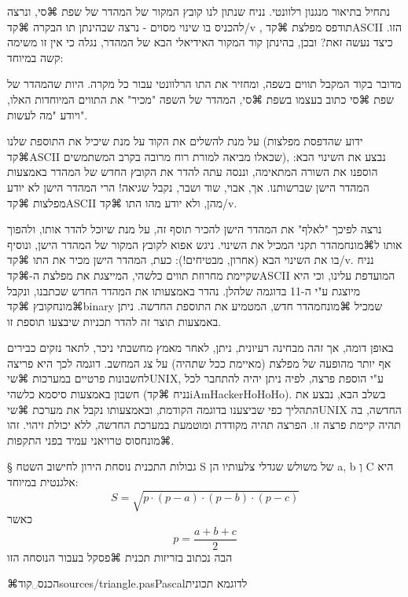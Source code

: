 {נתחיל בתיאור מנגנון רלוונטי. נניח שנתון לנו קובץ המקור של המהדר של שפת ⌘סי, ונרצה להכניס בו שינוי מסוים - נרצה שבהינתן תו הבקרה ⌘קד{/v} , תודפס מפלצת ⌘קד{ASCII} הזו. כיצד נעשה זאת? ובכן, בהינתן קוד המקור האידיאלי הבא של המהדר, נגלה כי אין זו משימה קשה במיוחד:

מדובר בקוד המקבל תווים בשפה, ומחזיר את התו הרלוונטי עבור כל מקרה. היות שהמהדר של שפת ⌘סי כתוב בעצמו בשפת ⌘סי, המהדר של השפה "מכיר" את התווים המיוחדות האלו, ויודע "מה לעשות". 

על מנת להשלים את הקוד על מנת שיכיל את התוספת שלנו (ידוע שהדפסת מפלצות ⌘קד{ASCII} שכאלו מביאה למורת רוח מרובה בקרב המשתמשים), נבצע את השינוי הבא: 
הוספנו את השורה המתאימה, וננסה עתה להדר את הקובץ החדש של המהדר באמצעות המהדר הישן שברשותנו. אך, אבוי, שוד ושבר, נקבל שגיאה! הרי המהדר הישן לא יודע מפלצות ⌘קד{ASCII} מהן, ולא יודע מהו התו ⌘קד{/v}. 

נרצה לפיכך "לאלף" את המהדר הישן להכיר תוסף זה, על מנת שיוכל להדר אותו, ולהפוך אותו ל⌘מונח{מהדר} תקני המכיל את השינוי. ניגש אפוא לקובץ המקור של המהדר הישן, ונוסיף בו את השינוי הבא (אחרון, מבטיחים!):
כעת, המהדר הישן מכיר את התו ⌘קד{/v}. נניח שקיימת מחרוזת תווים כלשהי, המייצגת את מפלצת ה-⌘קד{ASCII} המועדפת עלינו, וכי היא מיוצגת ע"י ה-11 בדוגמה שלהלן. נהדר באמצעותו את המהדר החדש שכתבנו, ונקבל ⌘מונח{קובץ} ⌘קד{binary} שמכיל ⌘מונח{מהדר} חדש, המטמיע את התוספת החדשה. ניתן באמצעות תוצר זה להדר תכניות שיבצעו תוספת זו.

באופן דומה, אך זהה מבחינה רעיונית, ניתן, לאחר מאמץ מחשבתי ניכר, לתאר נזקים כבירים אף יותר מהופעה של מפלצת (מאיימת ככל שתהיה) על צג המחשב. דוגמה לכך היא פריצה לחשבונות פרטיים במערכות ⌘שי{UNIX}, ע"י הוספת פרצה, לפיה ניתן יהיה להתחבר לכל חשבון באמצעות סיסמא כלשהי (נניח ⌘קד{iAmHackerHoHoHo}). בשלב הבא, נבצע את התהליך כפי שביצענו בדוגמה הקודמת, ובאמצעותו נקבל את מערכת ⌘שי{UNIX} החדשה, בה תהיה קיימת פרצה זו. הפרצה תהיה מקודדת ומוטמעת במערכת החדשה, ללא יכולת זיהוי. זהו ⌘מונח{סוס טרויאני} עמיד בפני התקפות.

§ גבולות התכנית
נוסחת הירון לחישוב השטח S של משולש שגדלי צלעותיו הן a, b  וְ C היא אלגנטית במיוחד:
\[
S=\sqrt{p\cdot(p-a)\cdot(p-b)\cdot(p-c)}
\]
כאשר
\[
p=\frac{a+b+c}{2}
\]
הבה נכתוב בזריזות תכנית ⌘פסקל בעבור הנוסחה הזו

⌘הכנס␣קוד{sources/triangle.pas}{Pascal}{לדוגמא תכונית}

}

